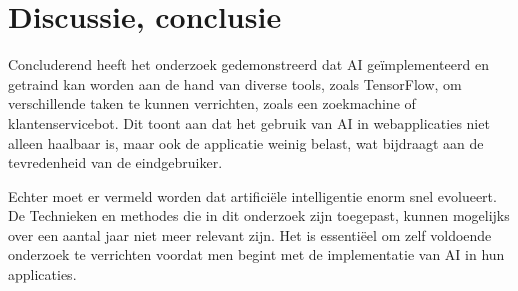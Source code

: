 \documentclass[dutch]{hogent-article}
\begin{document}
\section{Discussie, conclusie}%
\label{sec:discussion-conclusion}
Concluderend heeft het onderzoek gedemonstreerd dat AI geïmplementeerd en getraind kan worden aan de hand van diverse tools, zoals TensorFlow, om verschillende taken te kunnen verrichten, zoals een zoekmachine of klantenservicebot. Dit toont aan dat het gebruik van AI in webapplicaties niet alleen haalbaar is, maar ook de applicatie weinig belast, wat bijdraagt aan de tevredenheid van de eindgebruiker.

Echter moet er vermeld worden dat artificiële intelligentie enorm snel evolueert. De Technieken en methodes die in dit onderzoek zijn toegepast, kunnen mogelijks over een aantal jaar niet meer relevant zijn. Het is essentiëel om zelf voldoende onderzoek te verrichten voordat men begint met de implementatie van AI in hun applicaties.




\printbibliography[heading=bibintoc]
\end{document}
